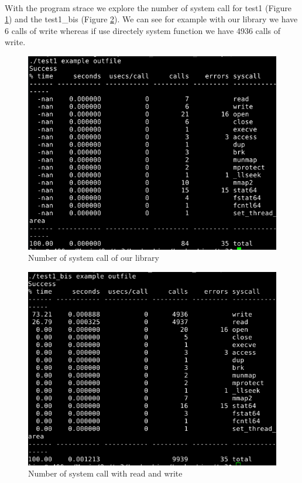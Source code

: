\documentclass[a4paper,10pt]{article}
\begin{document}
\paragraph{} With the program strace we explore
the number of system call for test1 (Figure \ref{our}) and the 
test1\_bis (Figure \ref{sys}). We can see for example with our library
we have 6 calls of write whereas if use directely system function we have
4936 calls of write. 
\begin{figure}[ht]
\center 
\includegraphics[width=0.85\linewidth]{my_strace.png}
\caption{Number of system call of our library}
\label{our}
\end{figure}
\begin{figure}[ht]
\center 
\includegraphics[width=0.85\linewidth]{syscall_strace.png}
\caption{Number of system call with read and write}
\label{sys}
\end{figure}
\end{document}
